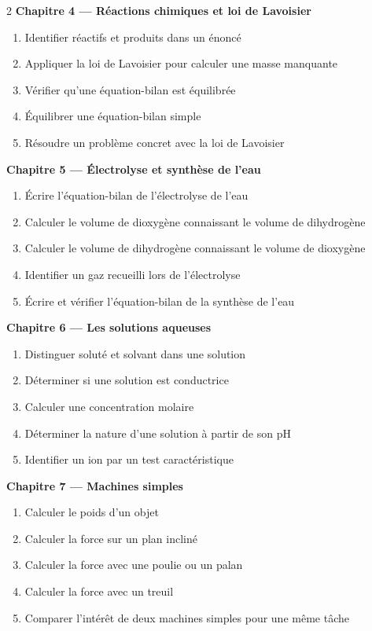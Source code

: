 \begin{multicols}{2}
\textbf{\normalsize\color{onbo}Chapitre 4 --- Réactions chimiques et loi de Lavoisier}
\begin{enumerate}[label=\arabic*.,itemsep=1pt,topsep=2pt,leftmargin=1.6em]
\item Identifier réactifs et produits dans un énoncé
\item Appliquer la loi de Lavoisier pour calculer une masse manquante
\item Vérifier qu'une équation-bilan est équilibrée
\item Équilibrer une équation-bilan simple
\item Résoudre un problème concret avec la loi de Lavoisier
\end{enumerate}
\vspace{4pt}

\textbf{\normalsize\color{onbo}Chapitre 5 --- Électrolyse et synthèse de l'eau}
\begin{enumerate}[label=\arabic*.,itemsep=1pt,topsep=2pt,leftmargin=1.6em]
\item Écrire l'équation-bilan de l'électrolyse de l'eau
\item Calculer le volume de dioxygène connaissant le volume de dihydrogène
\item Calculer le volume de dihydrogène connaissant le volume de dioxygène
\item Identifier un gaz recueilli lors de l'électrolyse
\item Écrire et vérifier l'équation-bilan de la synthèse de l'eau
\end{enumerate}
\vspace{4pt}

\textbf{\normalsize\color{onbo}Chapitre 6 --- Les solutions aqueuses}
\begin{enumerate}[label=\arabic*.,itemsep=1pt,topsep=2pt,leftmargin=1.6em]
\item Distinguer soluté et solvant dans une solution
\item Déterminer si une solution est conductrice
\item Calculer une concentration molaire
\item Déterminer la nature d'une solution à partir de son pH
\item Identifier un ion par un test caractéristique
\end{enumerate}
\vspace{4pt}

\textbf{\normalsize\color{onbo}Chapitre 7 --- Machines simples}
\begin{enumerate}[label=\arabic*.,itemsep=1pt,topsep=2pt,leftmargin=1.6em]
\item Calculer le poids d'un objet
\item Calculer la force sur un plan incliné
\item Calculer la force avec une poulie ou un palan
\item Calculer la force avec un treuil
\item Comparer l'intérêt de deux machines simples pour une même tâche
\end{enumerate}
\vspace{4pt}


\end{multicols}
